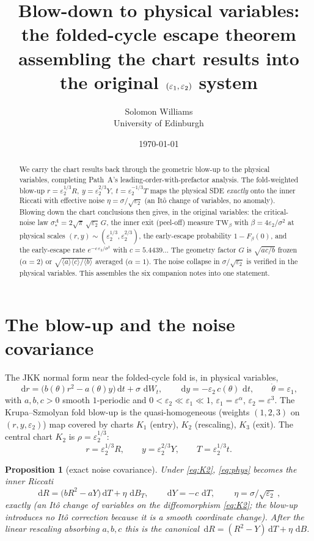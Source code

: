 \documentclass[11pt]{article}
\title{\textbf{Blow-down to physical variables: the folded-cycle escape theorem}\\[2pt]
\large assembling the chart results into the original $(\ep_1,\ep_2)$ system}
\author{Solomon Williams \\ \small University of Edinburgh}
\date{\today}
\newtheorem{proposition}{Proposition}
\theoremstyle{remark}
\newcommand{\dd}{\,\mathrm{d}}
\newcommand{\TW}{\mathrm{TW}}
\newcommand{\ep}{\varepsilon}
\begin{document}
\maketitle

\begin{abstract}\noindent
We carry the chart results back through the geometric blow-up to the physical variables,
completing Path~A's leading-order-with-prefactor analysis. The fold-weighted blow-up
$r=\ep_2^{1/3}R,\ y=\ep_2^{2/3}Y,\ t=\ep_2^{-1/3}T$ maps the physical SDE \emph{exactly}
onto the inner Riccati with effective noise $\eta=\sigma/\sqrt{\ep_2}$ (an It\^o change of
variables, no anomaly). Blowing down the chart conclusions then gives, in the original
variables: the critical-noise law
$\sigma_*^A=2\sqrt\pi\,\sqrt{\ep_2}\,G$, the inner exit (peel-off) measure
$\TW_\beta$ with $\beta=4\ep_2/\sigma^2$ at physical scales
$(r,y)\sim(\ep_2^{1/3},\ep_2^{2/3})$, the early-escape probability $1-F_\beta(0)$, and the
early-escape rate $e^{-c\,\ep_2/\sigma^2}$ with $c=5.4439\ldots$ The geometry factor $G$ is
$\sqrt{ac/b}$ frozen ($\alpha=2$) or $\sqrt{\langle a\rangle\langle c\rangle/\langle
b\rangle}$ averaged ($\alpha=1$). The noise collapse in $\sigma/\sqrt{\ep_2}$ is verified
in the physical variables. This assembles the six companion notes into one statement.
\end{abstract}

\section{The blow-up and the noise covariance}

The JKK normal form near the folded-cycle fold is, in physical variables,
\begin{equation}\label{eq:phys}
  \dd r=\bigl(b(\theta)r^2-a(\theta)y\bigr)\dd t+\sigma\,\dd W_t,\qquad
  \dd y=-\ep_2\,c(\theta)\,\dd t,\qquad \dot\theta=\ep_1,
\end{equation}
with $a,b,c>0$ smooth $1$-periodic and $0<\ep_2\ll\ep_1\ll1$, $\ep_1=\ep^\alpha$,
$\ep_2=\ep^3$. The Krupa--Szmolyan fold blow-up is the quasi-homogeneous (weights
$(1,2,3)$ on $(r,y,\ep_2)$) map covered by charts $K_1$ (entry), $K_2$ (rescaling), $K_3$
(exit). The central chart $K_2$ is $\rho=\ep_2^{1/3}$:
\begin{equation}\label{eq:K2}
  r=\ep_2^{1/3}R,\qquad y=\ep_2^{2/3}Y,\qquad T=\ep_2^{1/3}t .
\end{equation}

\begin{proposition}[exact noise covariance]\label{prop:noise}
Under \eqref{eq:K2}, \eqref{eq:phys} becomes the inner Riccati
\[
  \dd R=\bigl(b R^2-a Y\bigr)\dd T+\eta\,\dd B_T,\qquad \dd Y=-c\,\dd T,
  \qquad \boxed{\ \eta=\sigma/\sqrt{\ep_2}\ } ,
\]
exactly (an It\^o change of variables on the diffeomorphism \eqref{eq:K2}; the blow-up
introduces no It\^o correction because it is a smooth coordinate change). After the linear
rescaling absorbing $a,b,c$ this is the canonical $\dd R=(R^2-Y)\dd T+\eta\,\dd B$.
\end{proposition}
\end{document}
